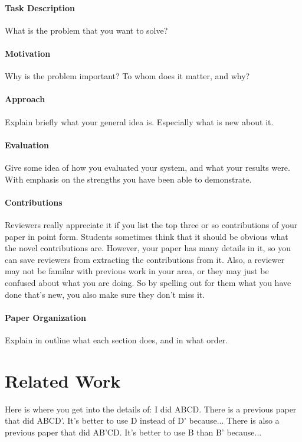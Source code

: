 \documentclass{article}
\begin{document}
\paragraph{Task Description}
What is the problem that you want to solve? 
\paragraph{Motivation} Why is the problem important? To whom does it matter, and why? 

\paragraph{Approach} Explain briefly what your general idea is. Especially what is new about it.

\paragraph{Evaluation} Give some idea of how you evaluated your system, and what your results were. With emphasis on the strengths you have been able to demonstrate.

\paragraph{Contributions} Reviewers really appreciate it if you list the top three or so contributions of your paper in point form. Students sometimes think that it should be obvious what the novel contributions are. However, your paper has many details in it, so you can save reviewers from extracting the contributions from it. Also, a reviewer may  not be familar with previous work in your area, or they may just be confused about what you are doing. So by spelling out for them what you have done that's new, you also make sure they don't miss it.

\paragraph{Paper Organization} Explain in outline what each section does, and in what order.

\section{Related Work} Here is where you get into the details of: I did ABCD. There is a previous paper that did ABCD'. It's better to use D instead of D' because... There is also a previous paper that did AB'CD. It's better to use B than B' because...
\end{document}
